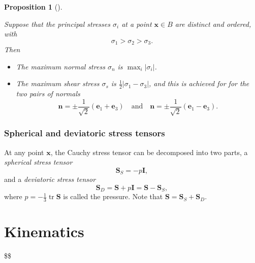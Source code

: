 \documentclass[
  letterpaper,
  DIV=11,
  numbers=noendperiod]{scrreprt}
\theoremstyle{plain}
\newtheorem{proposition}{Proposition}[chapter]
\theoremstyle{remark}
\begin{document}
\begin{proposition}[]\protect\hypertarget{prp-maxstresses}{}\label{prp-maxstresses}

Suppose that the principal stresses \(\sigma_i\) at a point
\({\boldsymbol{x}}\in B\) are distinct and ordered, with
\[\sigma_1>\sigma_2>\sigma_3.\] Then

\begin{itemize}
\item
  The maximum normal stress \(\sigma_n\) is \(\max_i|\sigma_i|\).
\item
  The maximum shear stress \(\sigma_s\) is
  \(\frac12|\sigma_1-\sigma_3|\), and this is achieved for for the two
  pairs of normals
  \[{\boldsymbol{n}}= \pm\frac{1}{\sqrt 2}({\boldsymbol{e}}_1+{\boldsymbol{e}}_3)\quad\text{and}\quad{\boldsymbol{n}}= \pm\frac{1}{\sqrt 2}({\boldsymbol{e}}_1-{\boldsymbol{e}}_3).\]
\end{itemize}

\end{proposition}

\subsection{Spherical and deviatoric stress
tensors}\label{spherical-and-deviatoric-stress-tensors}

At any point \({\boldsymbol{x}}\), the Cauchy stress tensor can be
decomposed into two parts, a \emph{spherical stress tensor}
\[{\boldsymbol{S}}_S = -p{\boldsymbol{I}},\] and a \emph{deviatoric
stress tensor}
\[{\boldsymbol{S}}_D = {\boldsymbol{S}}+p{\boldsymbol{I}}= {\boldsymbol{S}}-{\boldsymbol{S}}_S,\]
where \(p=-\frac13{\operatorname{tr}}{\boldsymbol{S}}\) is called the
pressure. Note that
\({\boldsymbol{S}}={\boldsymbol{S}}_S+{\boldsymbol{S}}_D\).


\chapter{Kinematics}\label{sec-kinematics}

\$\$ \newcommand{\bfa}{{\boldsymbol{a}}}
\newcommand{\bfb}{{\boldsymbol{b}}} \newcommand{\bfc}{{\boldsymbol{c}}}
\newcommand{\bfd}{{\boldsymbol{d}}} \newcommand{\bfe}{{\boldsymbol{e}}}
\newcommand{\bff}{{\boldsymbol{f}}} \newcommand{\bfg}{{\boldsymbol{g}}}
\newcommand{\bfh}{{\boldsymbol{h}}} \newcommand{\bfi}{{\boldsymbol{i}}}
\newcommand{\bfj}{{\boldsymbol{j}}} \newcommand{\bfk}{{\boldsymbol{k}}}
\newcommand{\bfl}{{\boldsymbol{l}}} \newcommand{\bfm}{{\boldsymbol{m}}}
\newcommand{\bfn}{{\boldsymbol{n}}} \newcommand{\bfo}{{\boldsymbol{o}}}
\newcommand{\bfp}{{\boldsymbol{p}}} \newcommand{\bfq}{{\boldsymbol{q}}}
\newcommand{\bfr}{{\boldsymbol{r}}} \newcommand{\bfs}{{\boldsymbol{s}}}
\newcommand{\bft}{{\boldsymbol{t}}} \newcommand{\bfu}{{\boldsymbol{u}}}
\newcommand{\bfv}{{\boldsymbol{v}}} \newcommand{\bfw}{{\boldsymbol{w}}}
\newcommand{\bfx}{{\boldsymbol{x}}} \newcommand{\bfy}{{\boldsymbol{y}}}
\newcommand{\bfz}{{\boldsymbol{z}}}
\end{document}
